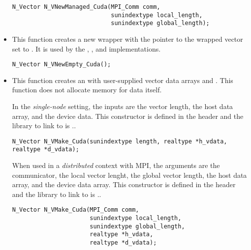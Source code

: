 \begin{itemize}
\begin{verbatim}
N_Vector N_VNewManaged_Cuda(MPI_Comm comm,
                            sunindextype local_length,
                            sunindextype global_length);
\end{verbatim}


\item {}

  This function creates a new {\nvector} wrapper with the pointer to
  the wrapped {\cuda} vector set to . It is used by the
  , , and 
  implementations.

\begin{verbatim}
N_Vector N_VNewEmpty_Cuda();
\end{verbatim}


\item {}

  This function creates an {\nveccuda} with user-supplied vector data arrays
   and . This function does not allocate memory for
  data itself.
  
  In the \textit{single-node} setting, the inputs are the vector length, the
  host data array, and the device data. This constructor is defined in the
  header  and the library to link to is
  ..

\begin{verbatim}
N_Vector N_VMake_Cuda(sunindextype length, realtype *h_vdata, realtype *d_vdata);
\end{verbatim}

  When used in a \textit{distributed} context with MPI, the arguments are the
  {\mpi} communicator, the local vector lenght, the global vector length, the
  host data array, and the device data array. This constructor is defined in the
  header  and the library to link to is
  ..

\begin{verbatim}
N_Vector N_VMake_Cuda(MPI_Comm comm,
                      sunindextype local_length,
                      sunindextype global_length,
                      realtype *h_vdata,
                      realtype *d_vdata);
\end{verbatim}


\end{itemize}
